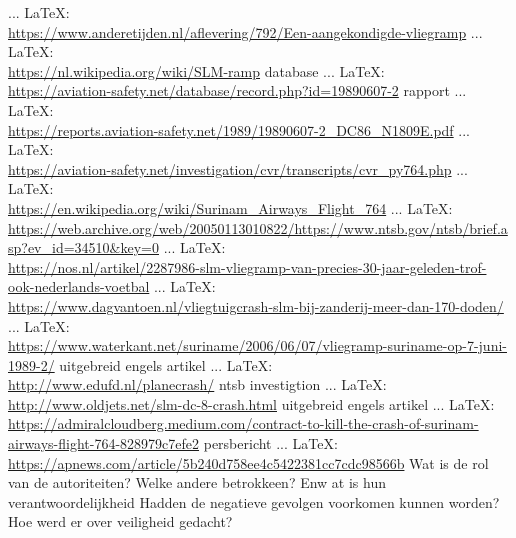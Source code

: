 \begin{thebibliography}{99}
{{{	 ... \LaTeX:\\ \url{https://www.anderetijden.nl/aflevering/792/Een-aangekondigde-vliegramp}
	 ... \LaTeX:\\ \url{https://nl.wikipedia.org/wiki/SLM-ramp}
	database
	 ... \LaTeX:\\ \url{https://aviation-safety.net/database/record.php?id=19890607-2}
	rapport
	 ... \LaTeX:\\ \url{https://reports.aviation-safety.net/1989/19890607-2_DC86_N1809E.pdf}
	 ... \LaTeX:\\ \url{https://aviation-safety.net/investigation/cvr/transcripts/cvr_py764.php}
	 ... \LaTeX:\\ \url{https://en.wikipedia.org/wiki/Surinam_Airways_Flight_764}
	 ... \LaTeX:\\ \url{https://web.archive.org/web/20050113010822/https://www.ntsb.gov/ntsb/brief.asp?ev_id=34510&key=0}
	 ... \LaTeX:\\ \url{https://nos.nl/artikel/2287986-slm-vliegramp-van-precies-30-jaar-geleden-trof-ook-nederlands-voetbal}
	 ... \LaTeX:\\ \url{https://www.dagvantoen.nl/vliegtuigcrash-slm-bij-zanderij-meer-dan-170-doden/}
	 ... \LaTeX:\\ \url{https://www.waterkant.net/suriname/2006/06/07/vliegramp-suriname-op-7-juni-1989-2/}
	uitgebreid engels artikel
	 ... \LaTeX:\\ \url{http://www.edufd.nl/planecrash/}
	ntsb investigtion
	 ... \LaTeX:\\ \url{http://www.oldjets.net/slm-dc-8-crash.html}
	uitgebreid engels artikel
	 ... \LaTeX:\\ \url{https://admiralcloudberg.medium.com/contract-to-kill-the-crash-of-surinam-airways-flight-764-828979c7efe2}
	persbericht
	 ... \LaTeX:\\ \url{https://apnews.com/article/5b240d758ee4c5422381cc7cdc98566b}
	Wat is de rol van de autoriteiten?
	Welke andere betrokkeen? Enw at is hun verantwoordelijkheid
	Hadden de negatieve gevolgen voorkomen kunnen worden?
	Hoe werd er over veiligheid gedacht?
	
}}}
\end{thebibliography}

